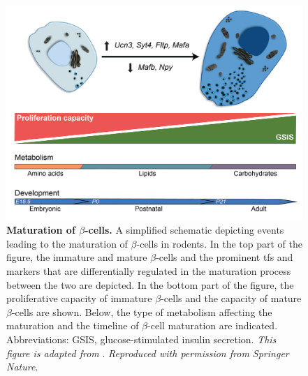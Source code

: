 \begin{figure}[t]
    \centering
    \includegraphics[width=12cm]{Chapter1/Fig/F1-16-01.png}
    \caption[Maturation of $\beta$-cells]{\textbf{Maturation of $\beta$-cells.} A simplified schematic depicting events leading to the maturation of $\beta$-cells in rodents. In the top part of the figure, the immature and mature $\beta$-cells and the prominent \glspl{tf} and markers that are differentially regulated in the maturation process between the two are depicted. In the bottom part of the figure, the proliferative capacity of immature $\beta$-cells and the  capacity of mature $\beta$-cells are shown. Below, the type of metabolism affecting the maturation and the timeline of $\beta$-cell maturation are indicated. Abbreviations: GSIS, glucose-stimulated insulin secretion. \textit{This figure is adapted from }\textbf{\cite{salinno_-cell_2019}}. \textit{Reproduced with permission from Springer Nature.}}
    \label{fig:chp1_betamat}
\end{figure}

